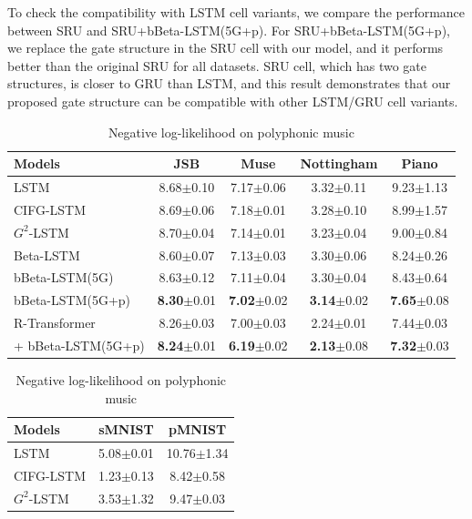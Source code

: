 \documentclass[letterpaper]{article} %
\begin{document}
%
To check the compatibility with LSTM cell variants, we compare the performance between SRU and SRU+bBeta-LSTM(5G+p). For SRU+bBeta-LSTM(5G+p), we replace the gate structure in the SRU cell with our model, and it performs better than the original SRU for all datasets. SRU cell, which has two gate structures, is closer to GRU than LSTM, and this result demonstrates that our proposed gate structure can be compatible with other LSTM/GRU cell variants.
%
\begin{table}[h!]
	\small
	\begin{minipage}{.61\linewidth}
		\centering
		\begin{tabular}{lcccc}
			\toprule
			Models & JSB & Muse & Nottingham & Piano \\
			\midrule
			LSTM & 8.68$\pm$0.10 & 7.17$\pm$0.06 &3.32$\pm$0.11 & 9.23$\pm$1.13 \\
			CIFG-LSTM & 8.69$\pm$0.06 & 7.18$\pm$0.01 &3.28$\pm$0.10 & 8.99$\pm$1.57 \\
			$G^{2}$-LSTM & 8.70$\pm$0.04 & 7.14$\pm$0.01 &3.23$\pm$0.04 & 9.00$\pm$0.84 \\
			\midrule
			Beta-LSTM   & 8.60$\pm$0.07 & 7.13$\pm$0.03& 3.30$\pm$0.06 & 8.24$\pm$0.26\\
			bBeta-LSTM(5G) & 8.63$\pm$0.12 & 7.11$\pm$0.04 & 3.30$\pm$0.04 & 8.43$\pm$0.64\\
			bBeta-LSTM(5G+p) & \textbf{8.30}$\pm$0.01 & \textbf{7.02}$\pm$0.02 & \textbf{3.14}$\pm$0.02 & \textbf{7.65}$\pm$0.08 \\
			\midrule
			R-Transformer   & 8.26$\pm$0.03 & 7.00$\pm$0.03& 2.24$\pm$0.01 & 7.44$\pm$0.03\\
			\hspace{1pt} + bBeta-LSTM(5G+p) & \textbf{8.24}$\pm$0.01 & \textbf{6.19}$\pm$0.02 & \textbf{2.13}$\pm$0.08 & \textbf{7.32}$\pm$0.03\\
			\bottomrule
		\end{tabular} 
		\caption{Negative log-likelihood on polyphonic music}
		\label{table:music}
	\end{minipage}%
	\begin{minipage}{.35\linewidth}
		\centering
		\begin{tabular}{lcc}
			\toprule
			Models & sMNIST & pMNIST \\
			\midrule
			LSTM    & 5.08$\pm$0.01 & 10.76$\pm$1.34 \\
			CIFG-LSTM & 1.23$\pm$0.13 & 8.42$\pm$0.58\\
			$G^{2}$-LSTM & 3.53$\pm$1.32 & 9.47$\pm$0.03\\

\end{tabular}
\end{minipage}
\end{table}
\end{document}
